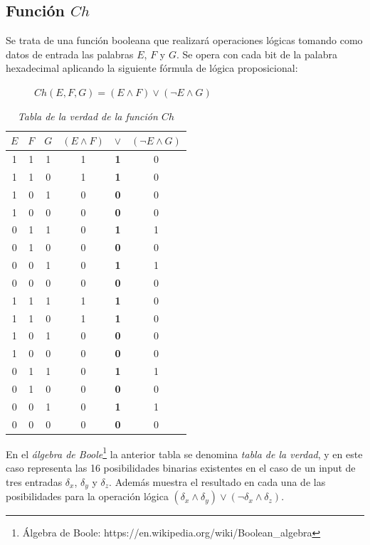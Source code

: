 \documentclass{article}
\begin{document}
    \subsection{Función $Ch$}
        Se trata de una función booleana que realizará operaciones lógicas tomando como datos de entrada las palabras $E$, $F$ y $G$. Se opera con cada bit de la palabra hexadecimal aplicando la siguiente fórmula de lógica proposicional:
            \begin{figure}[H]
            \centering
                $Ch(E, F, G) = (E \land F) \lor (\lnot E \land G)$
            \end{figure}
            \begin{table}[H]
            \centering
            \begin{tabular}{| c c c | c c c |} 
                \hline
                $E$ & $F$ & $G$ & $(E \land F)$ & $\lor$ & $(\lnot E \land G)$ \\
                \hline
                1 & 1 & 1 & 1 & \textbf1 & 0 \\
                1 & 1 & 0 & 1 & \textbf1 & 0 \\
                1 & 0 & 1 & 0 & \textbf0 & 0 \\
                1 & 0 & 0 & 0 & \textbf0 & 0 \\
                0 & 1 & 1 & 0 & \textbf1 & 1 \\
                0 & 1 & 0 & 0 & \textbf0 & 0 \\
                0 & 0 & 1 & 0 & \textbf1 & 1 \\
                0 & 0 & 0 & 0 & \textbf0 & 0 \\
                1 & 1 & 1 & 1 & \textbf1 & 0 \\
                1 & 1 & 0 & 1 & \textbf1 & 0 \\
                1 & 0 & 1 & 0 & \textbf0 & 0 \\
                1 & 0 & 0 & 0 & \textbf0 & 0 \\
                0 & 1 & 1 & 0 & \textbf1 & 1 \\
                0 & 1 & 0 & 0 & \textbf0 & 0 \\
                0 & 0 & 1 & 0 & \textbf1 & 1 \\
                0 & 0 & 0 & 0 & \textbf0 & 0 \\
                \hline
            \end{tabular}
            \caption{\textit{Tabla de la verdad de la función $Ch$}}
            \label{table:1}
            \end{table}
        En el \textit{álgebra de Boole}\footnote{Álgebra de Boole: https://en.wikipedia.org/wiki/Boolean\_algebra} la anterior tabla se denomina \textit{tabla de la verdad}, y en este caso representa las 16 posibilidades binarias existentes en el caso de un input de tres entradas $\delta_{x}$, $\delta_{y}$ y $\delta_{z}$. Además muestra el resultado en cada una de las posibilidades para la operación lógica $(\delta_{x} \land \delta_{y}) \lor (\lnot \delta_{x} \land \delta_{z})$.
        
\end{document}
